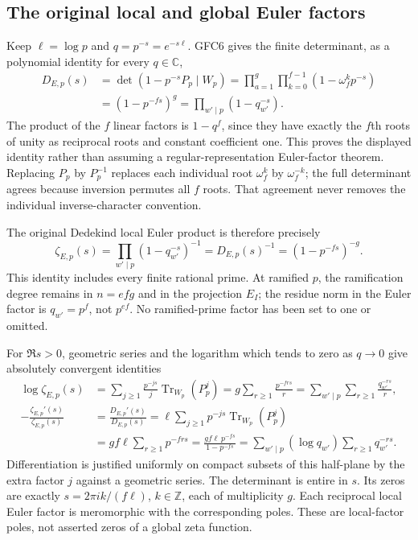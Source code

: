 \subsection{The original local and global Euler factors}

Keep $\ell=\log p$ and $q=p^{-s}=e^{-s\ell}$. GFC6 gives the finite
determinant, as a polynomial identity for every $q\in\mathbb C$,
\begin{equation}\tag{GFC8}
 \begin{split}
 D_{E,p}(s)&=\det(1-p^{-s}P_p\mid W_p)
   =\prod_{a=1}^{g}\prod_{k=0}^{f-1}
                  (1-\omega_f^k p^{-s})\\
   &=(1-p^{-fs})^g
    =\prod_{w'\mid p}(1-q_{w'}^{-s}).
 \end{split}
\end{equation}
The product of the $f$ linear factors is $1-q^f$, since they have
exactly the $f$th roots of unity as reciprocal roots and constant
coefficient one. This proves the displayed identity rather than
assuming a regular-representation Euler-factor theorem.
Replacing $P_p$ by $P_p^{-1}$ replaces each individual root
$\omega_f^k$ by $\omega_f^{-k}$; the full determinant agrees because
inversion permutes all $f$ roots. That agreement never removes the
individual inverse-character convention.

The original Dedekind local Euler product is therefore precisely
\begin{equation}\tag{GFC9}
 \zeta_{E,p}(s)=\prod_{w'\mid p}(1-q_{w'}^{-s})^{-1}
      =D_{E,p}(s)^{-1}=(1-p^{-fs})^{-g}.
\end{equation}
This identity includes every finite rational prime. At ramified $p$,
the ramification degree remains in $n=efg$ and in the projection
$E_I$; the residue norm in the Euler factor is $q_{w'}=p^f$, not
$p^{ef}$. No ramified-prime factor has been set to one or omitted.

For $\Re s>0$, geometric series and the logarithm which tends to zero
as $q\to0$ give absolutely convergent identities
\begin{equation}\tag{GFC10}
 \begin{split}
 \log\zeta_{E,p}(s)
   &=\sum_{j\ge1}\frac{p^{-js}}j\operatorname{Tr}_{W_p}(P_p^j)
     =g\sum_{r\ge1}\frac{p^{-frs}}r
     =\sum_{w'\mid p}\sum_{r\ge1}\frac{q_{w'}^{-rs}}r,\\
 -\frac{\zeta_{E,p}'(s)}{\zeta_{E,p}(s)}
   &=\frac{D_{E,p}'(s)}{D_{E,p}(s)}
     =\ell\sum_{j\ge1}p^{-js}\operatorname{Tr}_{W_p}(P_p^j)\\
   &=gf\ell\sum_{r\ge1}p^{-frs}
     =\frac{gf\ell\,p^{-fs}}{1-p^{-fs}}
     =\sum_{w'\mid p}(\log q_{w'})
                    \sum_{r\ge1}q_{w'}^{-rs}.
 \end{split}
\end{equation}
Differentiation is justified uniformly on compact subsets of this
half-plane by the extra factor $j$ against a geometric series.
The determinant is entire in $s$. Its zeros are exactly
$s=2\pi i k/(f\ell)$, $k\in\mathbb Z$, each of multiplicity $g$.
Each reciprocal local Euler factor is meromorphic with the corresponding
poles. These are local-factor poles, not asserted zeros of a global
zeta function.

